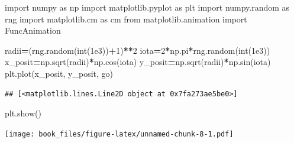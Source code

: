 \documentclass[
]{book}
\newenvironment{Shaded}{\begin{snugshade}}{\end{snugshade}}
\newcommand{\BuiltInTok}[1]{#1}
\newcommand{\DecValTok}[1]{\textcolor[rgb]{0.00,0.00,0.81}{#1}}
\newcommand{\FloatTok}[1]{\textcolor[rgb]{0.00,0.00,0.81}{#1}}
\newcommand{\ImportTok}[1]{#1}
\newcommand{\NormalTok}[1]{#1}
\newcommand{\OperatorTok}[1]{\textcolor[rgb]{0.81,0.36,0.00}{\textbf{#1}}}
\newcommand{\StringTok}[1]{\textcolor[rgb]{0.31,0.60,0.02}{#1}}
\begin{document}
\begin{Shaded}
\begin{Highlighting}[]
\ImportTok{import}\NormalTok{ numpy }\ImportTok{as}\NormalTok{ np}
\ImportTok{import}\NormalTok{ matplotlib.pyplot }\ImportTok{as}\NormalTok{ plt}
\ImportTok{import}\NormalTok{ numpy.random }\ImportTok{as}\NormalTok{ rng}
\ImportTok{import}\NormalTok{ matplotlib.cm }\ImportTok{as}\NormalTok{ cm}
\ImportTok{from}\NormalTok{ matplotlib.animation }\ImportTok{import}\NormalTok{ FuncAnimation}

\NormalTok{radii}\OperatorTok{=}\NormalTok{(rng.random(}\BuiltInTok{int}\NormalTok{(}\FloatTok{1e3}\NormalTok{))}\OperatorTok{+}\DecValTok{1}\NormalTok{)}\OperatorTok{**}\DecValTok{2}
\NormalTok{iota}\OperatorTok{=}\DecValTok{2}\OperatorTok{*}\NormalTok{np.pi}\OperatorTok{*}\NormalTok{rng.random(}\BuiltInTok{int}\NormalTok{(}\FloatTok{1e3}\NormalTok{))}
\NormalTok{x\_posit}\OperatorTok{=}\NormalTok{np.sqrt(radii)}\OperatorTok{*}\NormalTok{np.cos(iota)}
\NormalTok{y\_posit}\OperatorTok{=}\NormalTok{np.sqrt(radii)}\OperatorTok{*}\NormalTok{np.sin(iota)}
\NormalTok{plt.plot(x\_posit, y\_posit, }\StringTok{\textquotesingle{}go\textquotesingle{}}\NormalTok{)}
\end{Highlighting}
\end{Shaded}

\begin{verbatim}
## [<matplotlib.lines.Line2D object at 0x7fa273ae5be0>]
\end{verbatim}

\begin{Shaded}
\begin{Highlighting}[]
\NormalTok{plt.show()}
\end{Highlighting}
\end{Shaded}

\texttt{[image: book\_files/figure-latex/unnamed-chunk-8-1.pdf]}

  
\end{document}
